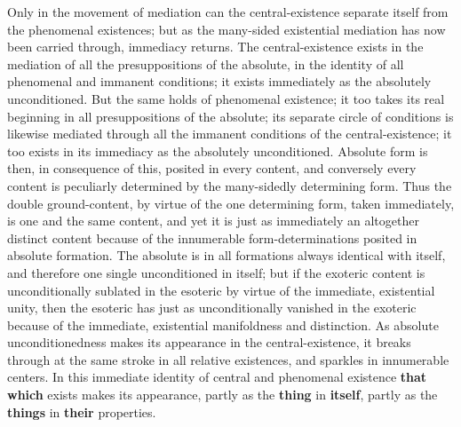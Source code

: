\documentclass[12pt,a4paper,openany]{book}
\newcommand{\opage}[1]{\marginnote{\footnotesize\textit{[#1]}}}
\begin{document}
Only in the movement of mediation can the central-existence
separate itself from the phenomenal existences; but
as the many-sided existential mediation has now been carried through,
immediacy returns. The central-existence
exists in the mediation of all the presuppositions of the absolute,
in the identity of all phenomenal and immanent
conditions; it exists immediately as the
absolutely unconditioned. But the same holds of
phenomenal existence; it too takes its real beginning
in all presuppositions of the absolute; its
separate circle of conditions is likewise mediated
\setcounter{footnote}{0}%
\opage{170}through all the immanent conditions of the central-existence;
it too exists in its immediacy as the absolutely
unconditioned. Absolute form is then, in consequence
of this, posited in every content, and conversely every
content is peculiarly determined by the many-sidedly determining
form. Thus the double ground-content,
by virtue of the one determining form, taken immediately,
is one and the same content, and yet it is just as
immediately an altogether distinct content because
of the innumerable form-determinations posited in absolute
formation. The absolute is in all formations
always identical with itself, and therefore one single
unconditioned in itself; but if the exoteric content is unconditionally
sublated in the esoteric by virtue of the immediate,
existential unity, then the esoteric has just as unconditionally
vanished in the exoteric because of the immediate,
existential manifoldness and distinction. As
absolute unconditionedness makes its appearance in the central-existence,
it breaks through at the same stroke
in all relative existences, and sparkles in innumerable
centers. In this immediate identity of central
and phenomenal existence \textbf{that which} exists makes
its appearance, partly as the \textbf{thing} in \textbf{itself}, partly as the \textbf{things}
in \textbf{their} properties.
\end{document}
